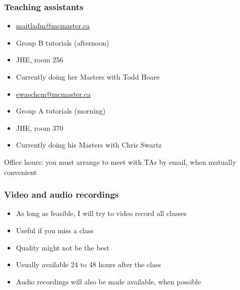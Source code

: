 \begin{frame}\frametitle{Teaching assistants}
	{\color{myGreen}{Danielle Maitland}}
	\begin{itemize}
		\item	\url{maitladm@mcmaster.ca}
		\item	Group B tutorials (afternoon)
		\item	JHE, room 256
		\item	Currently doing her Masters with Todd Hoare
	\end{itemize}
	\vspace{12pt}
	{\color{myGreen}{Chris Ewaschuk}}
	\begin{itemize}
		\item	\url{ewaschcm@mcmaster.ca}
		\item	Group A tutorials (morning)
		\item	JHE, room 370
		\item	Currently doing his Masters with Chris Swartz
	\end{itemize}
	\vspace{12pt}
	Office hours: you must arrange to meet with TAs by email, when mutually convenient
\end{frame}

\begin{frame}\frametitle{Video and audio recordings}
	\begin{itemize}
		\item	As long as feasible, I will try to video record all classes
		\item	Useful if you miss a class
		\item	Quality might not be the best
		\item	Usually available 24 to 48 hours after the class
		\item	Audio recordings will also be made available, when possible
	\end{itemize}
\end{frame}

